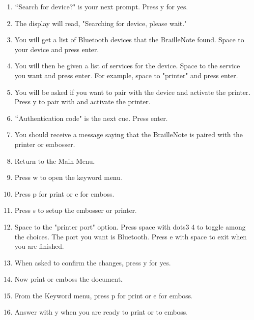 \documentclass[10pt,letterpaper,twoside]{report}
\begin{document}
{{{{\begin{enumerate}
	\item $``$Search for device?" is your next prompt.  Press y for yes.
	      
	\item The display will read, "Searching for device, please wait."
	      
	\item You will get a list of Bluetooth devices that the BrailleNote found. Space to your device and press enter.
	      
	\item You will then be given a list of services for the device.  Space to the service you want and press enter.  For example, space to "printer" and press enter.
	      
	\item You will be asked if you want to pair with the device and activate the printer.  Press y to pair with and activate the printer.
	      
	\item $``$Authentication code" is the next cue.  Press enter.
	      
	\item You should receive a message saying that the BrailleNote is paired with the printer or embosser.
	      
	\item Return to the Main Menu.
	      
	\item Press w to open the keyword menu.
	      
	\item Press p for print or e for emboss.
	      
	\item Press s to setup the embosser or printer.
	      
	\item Space to the "printer port" option.  Press space with dots3 4 to toggle among the choices.  The port you want is Bluetooth.  Press e with space to exit when you are finished.
	      
	\item When asked to confirm the changes, press y for yes.
	      
	\item Now print or emboss the document.
	      
	\item From the Keyword menu, press p for print or e for emboss.
	      
	\item Answer with y when you are ready to print or to emboss.
\end{enumerate}





}}}}
\end{document}
